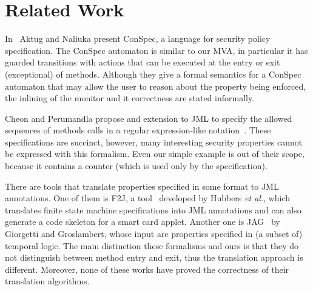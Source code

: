 \section{Related Work}\label{SecRelated}

In~\cite{Aktug07} Aktug and Naliuka present ConSpec, a language for security
policy specification.
The ConSpec automaton is similar to our MVA, in particular it
has guarded transitions with actions that can be executed at the entry or exit
(exceptional) of methods. Although they give a formal semantics for a ConSpec
automaton that may allow the user to reason about the property being enforced,
the inlining of the monitor and it correctness are stated informally.

Cheon and Perumandla propose and extension to JML to specify the allowed
sequences of methods calls in a regular expression-like notation~\cite{Cheon07}.
These specifications are succinct, however, many interesting
security properties cannot be expressed with this formalism. Even our simple
example is out of their scope, because it contains a counter (which is used
only by the specification).

There are tools that translate properties specified in some format to JML
annotations.
One of them is F2J, a tool~\cite{Hubbers03} developed by Hubbers \emph{et al.},
which translates finite state machine specifications into JML annotations and
can also generate a code skeleton for a smart card applet.
Another one is JAG~\cite{Giorgetti06} by Giorgetti and Groslambert, whose input
are properties specified in (a subset of) temporal logic.
The main distinction these formalisms and ours is that they do not distinguish
between method entry and exit, thus the translation approach is different.
Moreover, none of these works have proved the correctness of their translation
algorithms.

